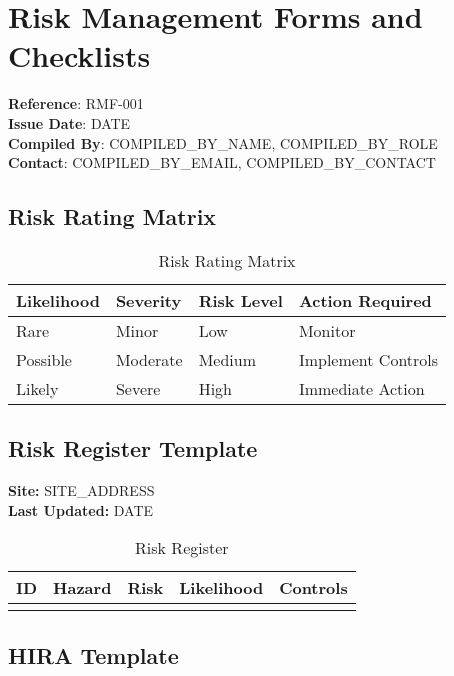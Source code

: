 \documentclass[11pt]{article}
\newcommand{\docTitle}{Risk Management Forms and Checklists}
\newcommand{\refNumber}{RMF-001}
\newcommand{\issueDate}{{{DATE}}}
\newcommand{\siteAddress}{{{SITE_ADDRESS}}}
\newcommand{\compilerName}{{{COMPILED_BY_NAME}}}
\newcommand{\compilerRole}{{{COMPILED_BY_ROLE}}}
\newcommand{\compilerEmail}{{{COMPILED_BY_EMAIL}}}
\newcommand{\compilerPhone}{{{COMPILED_BY_CONTACT}}}
\begin{document}
\section*{\docTitle}
\textbf{Reference}: \refNumber \\
\textbf{Issue Date}: \issueDate \\
\textbf{Compiled By}: \compilerName, \compilerRole \\
\textbf{Contact}: \compilerEmail, \compilerPhone

\subsection*{Risk Rating Matrix}

\begin{table}[h]
    \centering
    \begin{tabular}{p{3cm}p{3cm}p{3cm}p{3cm}}
        \toprule
        \textbf{Likelihood} & \textbf{Severity} & \textbf{Risk Level} & \textbf{Action Required} \\
        \midrule
        Rare & Minor & Low & Monitor \\
        Possible & Moderate & Medium & Implement Controls \\
        Likely & Severe & High & Immediate Action \\
        \bottomrule
    \end{tabular}
    \caption{Risk Rating Matrix}
\end{table}

\subsection*{Risk Register Template}

\textbf{Site:} \siteAddress \\
\textbf{Last Updated:} \issueDate

\begin{table}[h]
    \centering
    \begin{tabular}{p{2cm}p{3cm}p{3cm}p{3cm}p{3cm}}
        \toprule
        \textbf{ID} & \textbf{Hazard} & \textbf{Risk} & \textbf{Likelihood} & \textbf{Controls} \\
        \midrule
        & & & & \\
        \bottomrule
    \end{tabular}
    \caption{Risk Register}
\end{table}

\subsection*{HIRA Template}
\end{document}
